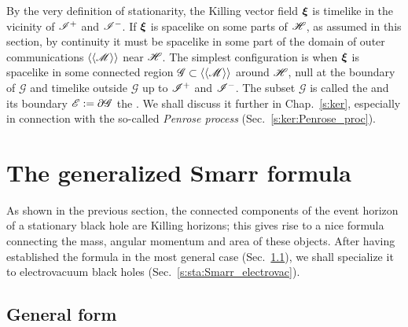 By the very definition of stationarity, the Killing vector field $\bm{\xi}$ is
timelike in the vicinity of $\mathscr{I}^+$ and $\mathscr{I}^-$. If $\bm{\xi}$ is spacelike
on some parts of $\mathscr{H}$, as assumed in this section, by continuity it must be spacelike
in some part of the domain of outer communications $\langle\langle \mathscr{M}\rangle\rangle$
near $\mathscr{H}$. The simplest configuration is when
$\bm{\xi}$ is spacelike in some connected region $\mathscr{G}\subset \langle\langle \mathscr{M}\rangle\rangle$
around $\mathscr{H}$, null at the boundary of $\mathscr{G}$ and timelike outside $\mathscr{G}$
up to $\mathscr{I}^+$ and $\mathscr{I}^-$. The subset $\mathscr{G}$ is
called the  and its boundary $\mathscr{E}:=\partial\mathscr{G}$
the . We shall discuss it further in Chap.~\ref{s:ker},
especially in connection with the so-called \emph{Penrose process}
(Sec.~\ref{s:ker:Penrose_proc}).


\section{The generalized Smarr formula} \label{s:sta:Smarr}

As shown in the previous section, the connected components of the event horizon of a stationary black hole are Killing horizons; this gives rise to a nice formula connecting the
mass, angular momentum and area of these objects. After having established
the formula in the most general case (Sec.~\ref{s:sta:Smarr_general}),
we shall specialize it to electrovacuum black holes (Sec.~\ref{s:sta:Smarr_electrovac}).

\subsection{General form} \label{s:sta:Smarr_general}

